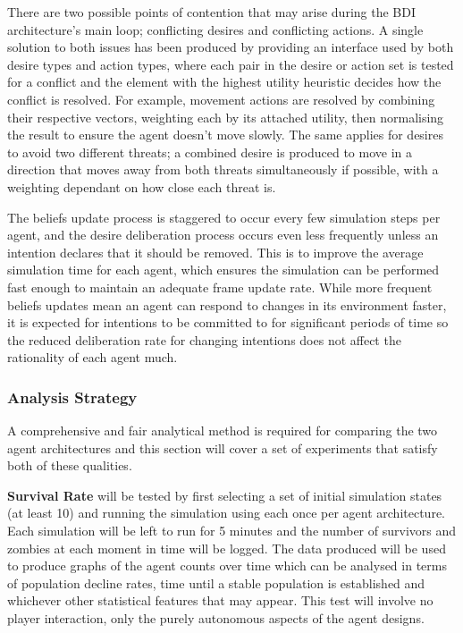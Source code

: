 \documentclass[a4paper,12pt]{article}
\begin{document}
There are two possible points of contention that may arise during the BDI architecture's main loop; conflicting desires and conflicting actions. A single solution to both issues has been produced by providing an interface used by both desire types and action types, where each pair in the desire or action set is tested for a conflict and the element with the highest utility heuristic decides how the conflict is resolved. For example, movement actions are resolved by combining their respective vectors, weighting each by its attached utility, then normalising the result to ensure the agent doesn't move slowly. The same applies for desires to avoid two different threats; a combined desire is produced to move in a direction that moves away from both threats simultaneously if possible, with a weighting dependant on how close each threat is.

The beliefs update process is staggered to occur every few simulation steps per agent, and the desire deliberation process occurs even less frequently unless an intention declares that it should be removed. This is to improve the average simulation time for each agent, which ensures the simulation can be performed fast enough to maintain an adequate frame update rate. While more frequent beliefs updates mean an agent can respond to changes in its environment faster, it is expected for intentions to be committed to for significant periods of time \cite{bonura09} so the reduced deliberation rate for changing intentions does not affect the rationality of each agent much.

\subsubsection{Analysis Strategy}\noindent
A comprehensive and fair analytical method is required for comparing the two agent architectures and this section will cover a set of experiments that satisfy both of these qualities.

\textbf{Survival Rate} will be tested by first selecting a set of initial simulation states (at least 10) and running the simulation using each once per agent architecture. Each simulation will be left to run for 5 minutes and the number of survivors and zombies at each moment in time will be logged. The data produced will be used to produce graphs of the agent counts over time which can be analysed in terms of population decline rates, time until a stable population is established and whichever other statistical features that may appear. This test will involve no player interaction, only the purely autonomous aspects of the agent designs.
\end{document}
